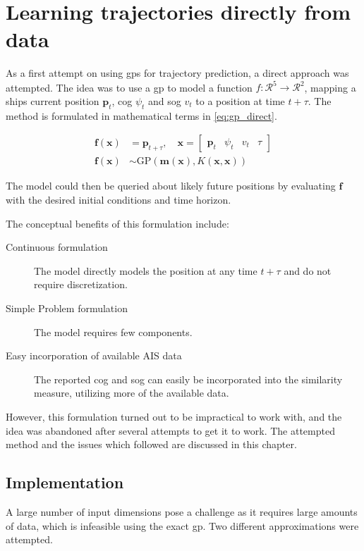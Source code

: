\chapter{Learning trajectories directly from data}
As a first attempt on using \acrshort{gp}s for trajectory prediction, a direct approach was attempted. The idea was to use a \acrshort{gp} to model a function $f: \mathcal{R}^5 \to \mathcal{R}^2$, mapping a ships current position $\boldsymbol{p}_t$, \acrshort{cog} $\psi_t$ and \acrshort{sog} $v_t$ to a position at time $t+\tau$. The method is formulated in mathematical terms in \cref{eq:gp_direct}. 

\begin{subequations}\label{eq:gp_direct}
\begin{align}
    \boldsymbol{f}(\boldsymbol{x}) &= \boldsymbol{p}_{t+\tau} \label{eq:gp_direct_f}, \quad \boldsymbol{x} = \begin{bmatrix} \boldsymbol{p}_t & \psi_t & v_t & \tau\end{bmatrix}\\
    \boldsymbol{f}(\boldsymbol{x}) &\sim \text{GP}(\boldsymbol{m}(\boldsymbol{x}), K(\boldsymbol{x}, \boldsymbol{x}))\label{eq:gp_direct_f_dist}
\end{align} 
\end{subequations}

The model could then be queried about likely future positions by evaluating $\boldsymbol{f}$ with the desired initial conditions and time horizon. 

The conceptual benefits of this formulation include:
\begin{description}
    \item[Continuous formulation] The model directly models the position at any time $t+\tau$ and do not require discretization. 
    \item[Simple Problem formulation] The model requires few components.
    \item[Easy incorporation of available AIS data] The reported \acrshort{cog} and \acrshort{sog} can easily be incorporated into the similarity measure, utilizing more of the available data.
\end{description}

However, this formulation turned out to be impractical to work with, and the idea was abandoned after several attempts to get it to work. The attempted method and the issues which followed are discussed in this chapter.


\section{Implementation}
A large number of input dimensions pose a challenge as it requires large amounts of data, which is infeasible using the exact \acrshort{gp}. Two different approximations were attempted.

